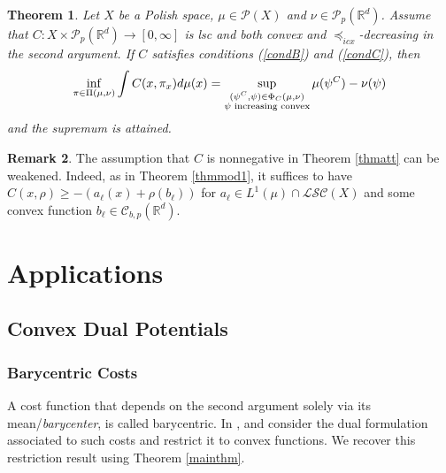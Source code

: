 \documentclass[reqno, a4paper]{amsart}
\newcommand{\lic}{\preceq_{icx}}
\newtheorem{theorem}{Theorem}[section]
\newcommand{\PP}{\mathcal{P}}
\newcommand{\R}{\mathbb R}
\theoremstyle{definition}
\theoremstyle{definition}
\theoremstyle{definition}
\newtheorem{remark}[theorem]{Remark}
\newcommand{\LSC}{\mathcal{LSC}}
\begin{document}
\begin{theorem} \label{thmatt2}
    Let $X$ be a Polish space, $\mu\in\PP(X)$ and $\nu\in\PP_p(\R^d)$. Assume that $C:X\times\PP_p(\R^d)\to[0,\infty]$ is lsc and both convex and  $\lic$-decreasing in the second argument. If $C$ satisfies conditions (\ref{condB}) and (\ref{condC}), then
   \begin{equation}
        \inf_{\pi\in\Pi(\mu,\nu)}\int C(x,\pi_x)d\mu(x)=\sup_{\substack{(\psi^C,\psi)\in\Phi_C(\mu,\nu) \\ \psi \textnormal{ increasing convex}}} \mu(\psi^C)-\nu(\psi)\label{att_eq2}
   \end{equation}
   and the supremum is attained. 
\end{theorem}


\begin{remark} \label{lowerboundremark}
    The assumption that $C$ is nonnegative in Theorem \ref{thmatt} can be weakened. Indeed, as in Theorem \ref{thmmod1}, it suffices to have $C(x,\rho)\geq-(a_{\ell}(x)+\rho(b_{\ell}))$ for $a_{\ell}\in L^1(\mu)\cap \LSC(X)$ and some convex function $b_{\ell}\in\mathcal{C}_{b,p}(\R^d)$. 
\end{remark}



\section{Applications}\label{APP}

\subsection{Convex Dual Potentials}




\subsubsection{Barycentric Costs}


\label{barcos}
A cost function that depends on the second argument solely via its mean/\textit{barycenter}, is called barycentric.
In \cite{GoJu18},  and  consider the dual formulation associated to such costs and restrict it to convex functions. We recover this restriction result using Theorem \ref{mainthm}.
\end{document}
